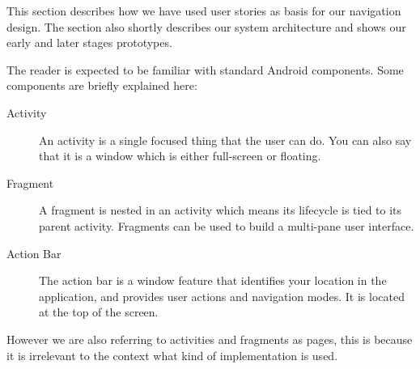 This section describes how we have used user stories as basis for our navigation design. The section also shortly describes our system architecture and shows our early and later stages prototypes.

The reader is expected to be familiar with standard Android components. Some components are briefly explained here:
\begin{description}
\item[Activity] An activity is a single focused thing that the user can do. You can also say that it is a window which is either full-screen or floating. \citep{activity}
\item[Fragment] A fragment is nested in an activity which means its lifecycle is tied to its parent activity. Fragments can be used to build a multi-pane user interface. \citep{fragment}
\item[Action Bar] The action bar is a window feature that identifies your location in the application, and provides user actions and navigation modes. It is located at the top of the screen. \citep{actionbar}
\end{description}

However we are also referring to activities and fragments as pages, this is because it is irrelevant to the context what kind of implementation is used.